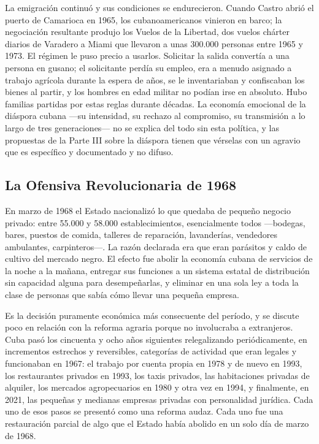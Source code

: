 La emigración continuó y sus condiciones se endurecieron. Cuando Castro abrió el
puerto de Camarioca en 1965, los cubanoamericanos vinieron en barco; la
negociación resultante produjo los Vuelos de la Libertad, dos vuelos chárter
diarios de Varadero a Miami que llevaron a unas 300.000 personas entre 1965 y
1973.\unv{} El régimen le puso precio a usarlos. Solicitar la salida convertía a
una persona en gusano; el solicitante perdía su empleo, era a menudo asignado a
trabajo agrícola durante la espera de años, se le inventariaban y confiscaban los
bienes al partir, y los hombres en edad militar no podían irse en absoluto. Hubo
familias partidas por estas reglas durante décadas. La economía emocional de la
diáspora cubana ---su intensidad, su rechazo al compromiso, su transmisión a lo
largo de tres generaciones--- no se explica del todo sin esta política, y las
propuestas de la Parte III sobre la diáspora tienen que vérselas con un agravio
que es específico y documentado y no difuso.

\subsection{La Ofensiva Revolucionaria de 1968}

En marzo de 1968 el Estado nacionalizó lo que quedaba de pequeño negocio privado:
entre 55.000 y 58.000 establecimientos, esencialmente todos ---bodegas, bares,
puestos de comida, talleres de reparación, lavanderías, vendedores ambulantes,
carpinteros---.\unv{} La razón declarada era que eran parásitos y caldo de
cultivo del mercado negro. El efecto fue abolir la economía cubana de servicios
de la noche a la mañana, entregar sus funciones a un sistema estatal de
distribución sin capacidad alguna para desempeñarlas, y eliminar en una sola ley
a toda la clase de personas que sabía cómo llevar una pequeña empresa.

Es la decisión puramente económica más consecuente del período, y se discute poco
en relación con la reforma agraria porque no involucraba a extranjeros. Cuba pasó
los cincuenta y ocho años siguientes relegalizando periódicamente, en incrementos
estrechos y reversibles, categorías de actividad que eran legales y funcionaban
en 1967: el trabajo por cuenta propia en 1978 y de nuevo en 1993, los
restaurantes privados en 1993, los taxis privados, las habitaciones privadas de
alquiler, los mercados agropecuarios en 1980 y otra vez en 1994, y finalmente, en
2021, las pequeñas y medianas empresas privadas con personalidad jurídica. Cada
uno de esos pasos se presentó como una reforma audaz. Cada uno fue una
restauración parcial de algo que el Estado había abolido en un solo día de marzo
de 1968.

